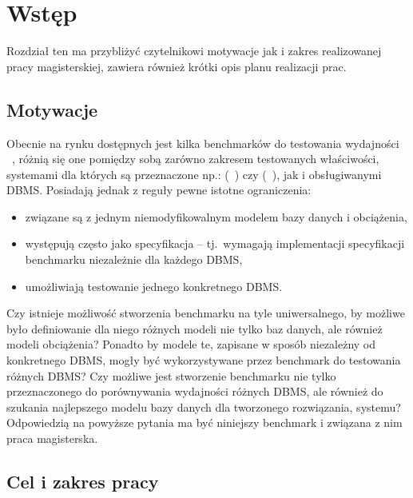 
\chapter{Wstęp}

Rozdział ten ma przybliżyć czytelnikowi motywacje jak i zakres realizowanej pracy magisterskiej, 
zawiera również krótki opis planu realizacji prac.

\section{Motywacje}\label{sect:Motywacje}

Obecnie na rynku dostępnych jest kilka benchmarków do testowania wydajności ~\cite{DBMS}, 
różnią się one pomiędzy sobą zarówno zakresem testowanych właściwości, systemami dla których
są przeznaczone np.:  (~\cite{OLTP}) 
czy  (~\cite{OLAP}),
jak i obsługiwanymi DBMS. Posiadają jednak z reguły pewne istotne ograniczenia:
\begin{itemize}
\item związane są z jednym niemodyfikowalnym modelem bazy danych i obciążenia,
\item występują często jako specyfikacja -- tj.~wymagają implementacji specyfikacji benchmarku niezależnie dla każdego DBMS,
\item umożliwiają testowanie jednego konkretnego DBMS.
\end{itemize}

Czy istnieje możliwość stworzenia benchmarku na tyle uniwersalnego,
by możliwe było definiowanie dla niego różnych modeli nie tylko baz danych,
ale również modeli obciążenia? Ponadto by modele te, zapisane w sposób niezależny
od konkretnego DBMS, mogły być wykorzystywane przez benchmark do testowania różnych DBMS?
Czy możliwe jest stworzenie benchmarku nie tylko przeznaczonego do porównywania wydajności
różnych DBMS, ale również do szukania najlepszego modelu bazy danych dla tworzonego rozwiązania, systemu?
Odpowiedzią na powyższe pytania ma być niniejszy benchmark i związana z nim praca magisterska.

\section{Cel i zakres pracy}

